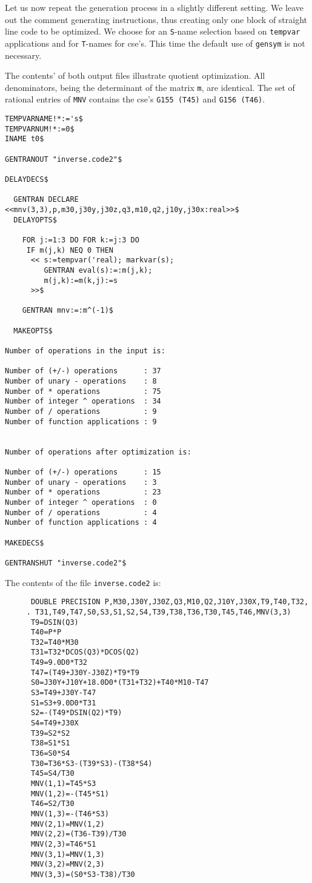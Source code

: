 Let us now repeat the generation process in a slightly different setting.
We leave out the comment generating instructions, thus creating only one
block of straight line code to be optimized. We choose for an {\tt S}-name
selection based on {\tt tempvar} applications and for {\tt T}-names for cse's.
This time the default use of {\tt gensym} is not necessary.

The contents' of both output files illustrate quotient optimization.
All denominators, being the determinant of the matrix {\tt m}, are identical.
The set of rational entries of {\tt MNV} contains the cse's {\tt G155 (T45)}
and {\tt G156 (T46)}.
{\small
\begin{verbatim}
TEMPVARNAME!*:='s$
TEMPVARNUM!*:=0$
INAME t0$

GENTRANOUT "inverse.code2"$

DELAYDECS$

  GENTRAN DECLARE <<mnv(3,3),p,m30,j30y,j30z,q3,m10,q2,j10y,j30x:real>>$
  DELAYOPTS$

    FOR j:=1:3 DO FOR k:=j:3 DO
     IF m(j,k) NEQ 0 THEN
      << s:=tempvar('real); markvar(s);
         GENTRAN eval(s):=:m(j,k);
         m(j,k):=m(k,j):=s
      >>$

    GENTRAN mnv:=:m^(-1)$

  MAKEOPTS$

Number of operations in the input is:

Number of (+/-) operations      : 37
Number of unary - operations    : 8
Number of * operations          : 75
Number of integer ^ operations  : 34
Number of / operations          : 9
Number of function applications : 9


Number of operations after optimization is:

Number of (+/-) operations      : 15
Number of unary - operations    : 3
Number of * operations          : 23
Number of integer ^ operations  : 0
Number of / operations          : 4
Number of function applications : 4

MAKEDECS$

GENTRANSHUT "inverse.code2"$
\end{verbatim}}

The contents of the file {\tt inverse.code2} is:
{\small
\begin{verbatim}
      DOUBLE PRECISION P,M30,J30Y,J30Z,Q3,M10,Q2,J10Y,J30X,T9,T40,T32,
     . T31,T49,T47,S0,S3,S1,S2,S4,T39,T38,T36,T30,T45,T46,MNV(3,3)
      T9=DSIN(Q3)
      T40=P*P
      T32=T40*M30
      T31=T32*DCOS(Q3)*DCOS(Q2)
      T49=9.0D0*T32
      T47=(T49+J30Y-J30Z)*T9*T9
      S0=J30Y+J10Y+18.0D0*(T31+T32)+T40*M10-T47
      S3=T49+J30Y-T47
      S1=S3+9.0D0*T31
      S2=-(T49*DSIN(Q2)*T9)
      S4=T49+J30X
      T39=S2*S2
      T38=S1*S1
      T36=S0*S4
      T30=T36*S3-(T39*S3)-(T38*S4)
      T45=S4/T30
      MNV(1,1)=T45*S3
      MNV(1,2)=-(T45*S1)
      T46=S2/T30
      MNV(1,3)=-(T46*S3)
      MNV(2,1)=MNV(1,2)
      MNV(2,2)=(T36-T39)/T30
      MNV(2,3)=T46*S1
      MNV(3,1)=MNV(1,3)
      MNV(3,2)=MNV(2,3)
      MNV(3,3)=(S0*S3-T38)/T30
\end{verbatim}}

